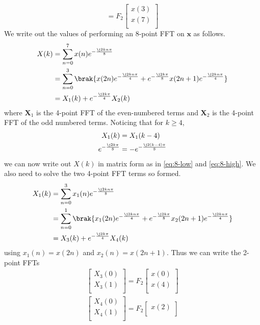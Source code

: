 \documentclass[journal,12pt,twocolumn]{IEEEtran}
\let\vec\mathbf
\renewcommand\thesection{\arabic{section}}
\begin{document}
\begin{enumerate}[label=\thesection.\arabic*.,ref=\thesection.\theenumi]
\begin{equation}
= F_{2}
\begin{bmatrix}
x(3) \\ 
x(7) \\ 
\end{bmatrix}
\end{equation}
\solution We write out the values of performing an 8-point FFT on $\vec{x}$ as follows.
\begin{align}
X(k) &= \sum_{n = 0}^{7}x(n)e^{-\frac{\j2kn\pi}{8}} \\
&= \sum_{n = 0}^{3}\brak{x(2n)e^{-\frac{\j2kn\pi}{4}} + e^{-\frac{\j2k\pi}{8}}x(2n + 1)e^{-\frac{\j2kn\pi}{4}}} \\
&= X_1(k) + e^{-\frac{\j2k\pi}{4}}X_2(k) 
\end{align}
where $\vec{X}_1$ is the 4-point FFT of the even-numbered terms and $\vec{X}_2$ is the 4-point FFT of the odd numbered terms. Noticing that for $k \geq 4$,
\begin{align}
	X_1(k) &= X_1(k - 4) \\
	e^{-\frac{\j2k\pi}{8}} &= -e^{-\frac{\j2(k - 4)\pi}{8}}
\end{align}
we can now write out $X(k)$ in matrix form as in \eqref{eq:8-low} and \eqref{eq:8-high}. We also need to solve the two 4-point FFT terms so formed.
\begin{align}
X_1(k) &= \sum_{n = 0}^{3}x_1(n)e^{-\frac{\j2kn\pi}{8}} \\
&= \sum_{n = 0}^{1}\brak{x_1(2n)e^{-\frac{\j2kn\pi}{4}} + e^{-\frac{\j2k\pi}{8}}x_2(2n + 1)e^{-\frac{\j2kn\pi}{4}}} \\
&= X_3(k) + e^{-\frac{\j2k\pi}{4}}X_4(k) 
\end{align}
using $x_1(n) = x(2n)$ and $x_2(n) = x(2n + 1)$. Thus we can write the 2-point FFTs
\begin{align}
\begin{bmatrix}
	X_{3}(0) \\ 
	X_{3}(1)\\ 
\end{bmatrix}
= F_{2}
\begin{bmatrix}
	x(0) \\ 
	x(4) \\ 
\end{bmatrix} \\
\begin{bmatrix}
	X_{4}(0) \\ 
	X_{4}(1)\\ 
\end{bmatrix}
= F_{2}
\begin{bmatrix}
	x(2) \\ 

\end{bmatrix}
\end{align}
\end{enumerate}
\end{document}
